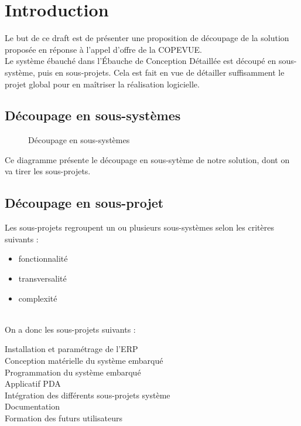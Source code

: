\section{Introduction}

Le but de ce draft est de présenter une proposition de découpage de la
solution proposée en réponse à l'appel d'offre de la COPEVUE.\\
Le système ébauché dans l'Ébauche de Conception Détaillée est découpé en
sous-système, puis en sous-projets. Cela est fait en vue de détailler
suffisamment le projet global pour en maîtriser la réalisation logicielle.

\subsection{Découpage en sous-systèmes}

\begin{figure}
\caption{Découpage en sous-systèmes}
\end{figure}

Ce diagramme présente le découpage en sous-sytème de notre solution, dont
on va tirer les sous-projets.

\subsection{Découpage en sous-projet}

Les sous-projets regroupent un ou plusieurs sous-systèmes selon les
critères suivants :
\begin{itemize}
\item fonctionnalité
\item transversalité
\item complexité
\end{itemize}

\hfill\\

On a donc les sous-projets suivants :
\begin{description}
\item[Installation et paramétrage de l'ERP]
\item[Conception matérielle du système embarqué]
\item[Programmation du système embarqué]
\item[Applicatif PDA]
\item[Intégration des différents sous-projets système]
\item[Documentation]
\item[Formation des futurs utilisateurs]
\end{description}
